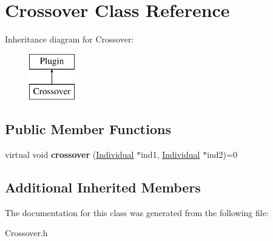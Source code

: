 \hypertarget{classCrossover}{}\section{Crossover Class Reference}
\label{classCrossover}
Inheritance diagram for Crossover\+:\begin{figure}[H]
\begin{center}
\leavevmode
\includegraphics[height=2.000000cm]{da/dcc/classCrossover}
\end{center}
\end{figure}
\subsection*{Public Member Functions}
\begin{DoxyCompactItemize}
\item 
\mbox{\label{classCrossover_ab116acf7d73233c76a6c906fc8d5edf6}} 
virtual void {\bfseries crossover} (\mbox{\hyperlink{classIndividual}{Individual}} $\ast$ind1, \mbox{\hyperlink{classIndividual}{Individual}} $\ast$ind2)=0
\end{DoxyCompactItemize}
\subsection*{Additional Inherited Members}


The documentation for this class was generated from the following file\+:\begin{DoxyCompactItemize}
\item 
Crossover.\+h\end{DoxyCompactItemize}
